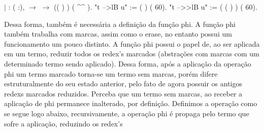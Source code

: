 \begin{coqdoccode}
\coqdocindent{1.00em}
\ensuremath{|}  : \coqdockw{\ensuremath{\forall}} ( :),\coqdoceol
\coqdocindent{2.00em}
  \ensuremath{\rightarrow}   \ensuremath{\rightarrow}\coqdoceol
\coqdocindent{2.00em}
 (( ) ) ( \^{}\^{} ).\coqdoceol
\coqdocnoindent
{} "t -->lB u" := (   ) (  60).\coqdoceol
\coqdocnoindent
{} "t -->>lB u" := ( ( )  ) (  60).\coqdoceol
\coqdocemptyline
\end{coqdoccode}
Dessa forma, também é necessária a definição da função phi. A função phi também trabalha
com marcas, assim como o erase, no entanto possui um funcionamento um pouco distinto. A função phi
possui o papel de, ao ser aplicada em um termo, reduzir todos os redex's marcados (abstrações
com marcas com um determinado termo sendo aplicado). Dessa forma, após a aplicação da operação phi
um termo marcado torna-se um termo sem marcas, porém difere estruturalmente do seu estado anterior,
pelo fato de agora possuir os antigos redexs marcados reduzidos. Perceba que um termo sem marcas, ao
receber a aplicação de phi permanece inalterado, por definição. Definimos a operação como se segue logo
abaixo, recursivamente, a operação phi é propaga pelo termo que sofre a aplicação, reduzindo os redex's

